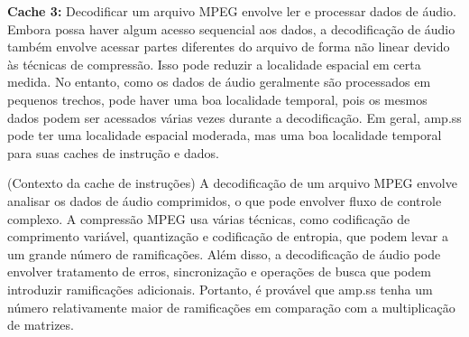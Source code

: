 \documentclass[12pt]{article}
\begin{document}
\textbf{Cache 3:}
Decodificar um arquivo MPEG envolve ler e processar dados de áudio. Embora possa haver algum acesso sequencial aos dados, a decodificação de áudio também envolve acessar partes diferentes do arquivo de forma não linear devido às técnicas de compressão. Isso pode reduzir a localidade espacial em certa medida. No entanto, como os dados de áudio geralmente são processados em pequenos trechos, pode haver uma boa localidade temporal, pois os mesmos dados podem ser acessados várias vezes durante a decodificação. Em geral, amp.ss pode ter uma localidade espacial moderada, mas uma boa localidade temporal para suas caches de instrução e dados.

(Contexto da cache de instruções)
A decodificação de um arquivo MPEG envolve analisar os dados de áudio comprimidos, o que pode envolver fluxo de controle complexo. A compressão MPEG usa várias técnicas, como codificação de comprimento variável, quantização e codificação de entropia, que podem levar a um grande número de ramificações. Além disso, a decodificação de áudio pode envolver tratamento de erros, sincronização e operações de busca que podem introduzir ramificações adicionais. Portanto, é provável que amp.ss tenha um número relativamente maior de ramificações em comparação com a multiplicação de matrizes.
\end{document}
